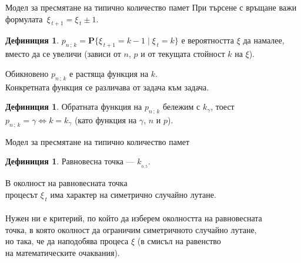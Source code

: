 \documentclass{beamer}
\theoremstyle{definition}
\newtheorem{defn}[thm]{Дефиниция}
\theoremstyle{remark}
\begin{document}
\begin{frame}{Модел за пресмятане на типично количество памет}
	При търсене с връщане важи формулата\,
    \mbox{$\xi_{\,t+1} = \xi_{\,t} \pm 1$.}
	\begin{defn}
		$p_{n\,;\,k} = \mathbf{P}\bigl\{\xi_{\,t+1} = k - 1 \mid \xi_{\,t} = k \bigr\}$
		е вероятността $\xi$ да намалее,\\
		вместо да се увеличи (зависи от $n$, $p$ и от текущата стойност $k$ на $\xi$).
	\end{defn}
	Обикновено $p_{n\,;\,k}$ е растяща функция на $k$.\\
	Конкретната функция се различава от задача към задача.
	\begin{defn} 
		Обратната функция на $p_{n\,;\,k}$ бележим с  $k_{\gamma}$, тоест\\
		$p_{n\,;\,k} = \gamma   \iff   k = k_{\gamma}$ (като функция на $\gamma$, $n$ и $p$).
	\end{defn}	
\end{frame}
\begin{frame}{Модел за пресмятане на типично количество памет}
	\begin{defn}
		Равновесна точка --- \mbox{$k_{_{\scriptstyle 0,5}}$.}
	\end{defn}
	В околност на равновесната точка\\
	процесът $\xi_{\,t}$ има характер на симетрично случайно лутане.\\
	\mbox{}\,\\
	Нужен ни е критерий, по който да изберем
	околността на равновесната\\ точка, в която околност да ограничим
	симетричното случайно лутане,\\ но така, че да наподобява процеса $\xi$
	(в смисъл на равенство\\ на математическите очаквания).
\end{frame}
\end{document}
